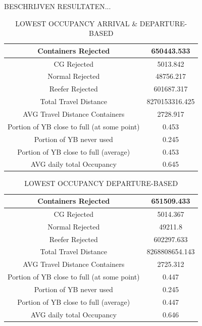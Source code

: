 \documentclass{article}
\begin{document}
BESCHRIJVEN RESULTATEN...
\begin{table}[h]
    \centering
    \begin{tabular}{|c|c|}
        \hline
        Containers Rejected                         & 650443.533     \\ \hline
        CG Rejected                                 & 5013.842       \\ \hline
        Normal Rejected                             & 48756.217      \\ \hline
        Reefer Rejected                             & 601687.317     \\ \hline
        Total Travel Distance                       & 8270153316.425 \\ \hline
        AVG Travel Distance Containers              & 2728.917       \\ \hline
        Portion of YB close to full (at some point) & 0.453          \\ \hline
        Portion of YB never used                    & 0.245          \\ \hline
        Portion of YB close to full (average)       & 0.453          \\ \hline
        AVG daily total Occupancy                   & 0.645          \\ \hline
    \end{tabular}
    \caption{LOWEST OCCUPANCY ARRIVAL \& DEPARTURE-BASED}
\end{table}

\begin{table}[h]
    \centering
    \begin{tabular}{|c|c|}
        \hline
        Containers Rejected                         & 651509.433     \\ \hline
        CG Rejected                                 & 5014.367       \\ \hline
        Normal Rejected                             & 49211.8        \\ \hline
        Reefer Rejected                             & 602297.633     \\ \hline
        Total Travel Distance                       & 8268808654.143 \\ \hline
        AVG Travel Distance Containers              & 2725.312       \\ \hline
        Portion of YB close to full (at some point) & 0.447          \\ \hline
        Portion of YB never used                    & 0.245          \\ \hline
        Portion of YB close to full (average)       & 0.447          \\ \hline
        AVG daily total Occupancy                   & 0.646          \\ \hline
    \end{tabular}
    \caption{LOWEST OCCUPANCY DEPARTURE-BASED}
\end{table}
\end{document}

